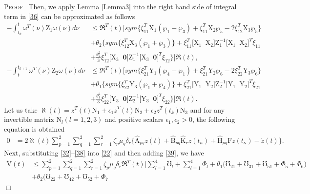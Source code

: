 \documentclass[preprint,11pt]{elsarticle}
\newenvironment{proof}{\noindent \textsc{Proof}\ }{\mbox{}\hfill $\Box$\\}
\begin{document}
\begin{proof}
Then, we apply Lemma \ref{Lemma3} into the right hand side of integral term in \eqref{36} can be approximated as follows
\begin{align}\label{37}
-\int^t_{t_k}\omega^T(\nu)\mathrm{Z}_1\omega(\nu)d\nu
&\leq \Re^T(t)\Big[sym\big\{ \xi_{11}^T \mathrm{X}_1(\wp_1-\wp_3)+\xi_{11}^T\mathrm{X}_2\wp_5-2\xi_{12}^T\mathrm{X}_3\wp_5\big\}\nonumber\\
&+\theta_{2}\Big\{sym\{\xi_{12}^T\mathrm{X}_3(\wp_1+\wp_3)\}+ \xi_{11}^T \big[\mathrm{X}_1\;\;\mathrm{X}_2 \big]\mathrm{Z}_1^{-1}\big[ \mathrm{X}_1\;\;\mathrm{X}_2 \big]^T\xi_{11}\nonumber\\
&+\frac{\theta_{2}^2}{3}\xi_{12}^T\big[ \mathrm{X}_3\;\;\mathbf{0} \big]\mathrm{Z}_1^{-1}\big[ \mathrm{X}_3\;\;\mathbf{0} \big]^T\xi_{12}
 \Big\}\Big]\Re(t),\\
-\int^{t_{k+1}}_{t}\omega^T(\nu)\mathrm{Z}_2\omega(\nu)d\nu
&\leq \Re^T(t)\Big[sym\big\{ \xi_{21}^T \mathrm{Y}_1(\wp_4-\wp_1)+\xi_{21}^T\mathrm{Y}_2\wp_6-2\xi_{22}^T\mathrm{Y}_3\wp_6\big\}\nonumber\\
&+\theta_{1}\Big\{sym\{\xi_{22}^T\mathrm{Y}_3(\wp_1+\wp_4)\}+ \xi_{21}^T \big[\mathrm{Y}_1\;\;\mathrm{Y}_2 \big]\mathrm{Z}_2^{-1}\big[ \mathrm{Y}_1\;\;\mathrm{Y}_2 \big]^T\xi_{21}\nonumber\\
&+\frac{\theta_{1}^2}{3}\xi_{22}^T\big[ \mathrm{Y}_3\;\;\mathbf{0} \big]\mathrm{Z}_2^{-1}\big[ \mathrm{Y}_3\;\;\mathbf{0} \big]^T\xi_{22}
 \Big\}\Big]\Re(t).\label{38}
\end{align}
Let us take $\aleph(t)=z^T(t)\mathrm{N}_1+\epsilon_1\dot{z}^T(t)\mathrm{N}_2+\epsilon_2z^T(t_k)\mathrm{N}_3 $ and for any invertible matrix $\mathrm{N}_l(l=1,2,3)$ and positive scalars $\epsilon_1,\epsilon_2>0$, the following equation is obtained
\begin{align}\label{39}
0&=2\aleph(t) \sum^{2}_{p=1}\sum^{2}_{q=1}\sum^{2}_{r=1}\zeta_p\mu_q\delta_r\big\{\mathrm{\widehat{A}}_{pq}z(t)
+\mathrm{\widehat{B}}_{pq}\mathrm{\widehat{K}}_rz(t_\kappa)+\mathrm{\widehat{H}}_{pq}\mathrm{F}z(t_\kappa)-\dot{z}(t)\big\}.
\end{align}
Next, substituting \eqref{32}–\eqref{38} into \eqref{22} and then adding \eqref{39}, we have
\begin{align}\label{40}
\mathrm{\dot{V}}(t)&\leq\sum^{2}_{p=1}\sum^{2}_{q=1}\sum^{2}_{r=1}\zeta_p\mu_q\delta_r\Re^T(t)\Big[
\sum^{4}_{l=1} \mho_l+\sum^{4}_{l=1} \Phi_l+\theta_1\big( \mho_{21}+\mho_{31}+\mho_{51}+\Phi_5+\Phi_6 \big)\nonumber\\
&+\theta_2\big( \mho_{22}+\mho_{42}+\mho_{52}+\Phi_7

\end{align}
\end{proof}
\end{document}
